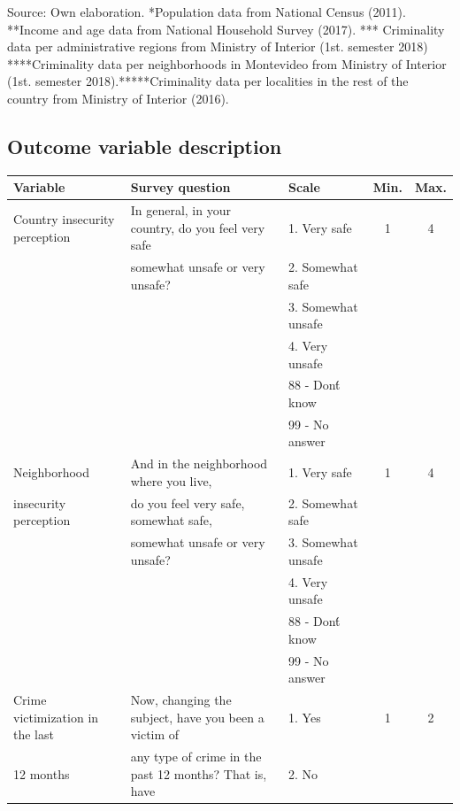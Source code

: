 \documentclass[11pt]{article}
\begin{document}
\begin{landscape}
\begin{longtable}[htbp]{@{}p{1.2cm}p{1cm}p{1.5cm}p{1cm}p{1cm}p{1cm}p{1cm}p{1cm}p{1cm}p{1cm}p{1cm}p{1.2cm}p{1cm}p{1cm}@{}}
\bottomrule
\end{longtable}

Source: Own elaboration. *Population data from National Census (2011). **Income and age data from National Household Survey (2017). *** Criminality data per administrative regions from Ministry of Interior (1st. semester 2018) ****Criminality data per neighborhoods in Montevideo from Ministry of Interior (1st. semester 2018).*****Criminality data per localities in the rest of the country from Ministry of Interior (2016).
\end{landscape}
\restoregeometry

\begin{landscape}
\section{Outcome variable description}
\begin{tiny}
\begin{tabular}{lllcc}
\textbf{Variable }	&	\textbf{Survey question} 	&	\textbf{Scale}	&	\textbf{Min.}	&	\textbf{Max.}		\\	\hline
\hline
Country insecurity  perception	&	In general, in your country, do you feel very safe	&	1. Very safe 	&	1	&	4		\\
	&	somewhat unsafe or very unsafe?	&	2. Somewhat safe 	&		&			\\
	&		&	3. Somewhat unsafe 	&		&			\\
	&		&	4. Very unsafe 	&		&			\\
	&		&	88 - Don\'t know 	&		&			\\
	&		&	99 - No answer	&		&			\\\hline
Neighborhood 	&	And in the neighborhood where you live, 	&	1. Very safe 	&	1	&	4		\\
insecurity perception	&	do you feel very safe, somewhat safe,	&	2. Somewhat safe 	&		&			\\
	&	somewhat unsafe or very unsafe?	&	3. Somewhat unsafe 	&		&			\\
	&		&	4. Very unsafe 	&		&			\\
	&		&	88 - Don\'t know 	&		&			\\
	&		&	99 - No answer	&		&			\\\hline
Crime victimization in the last 	&	Now, changing the subject, have you been a victim of 	&	1. Yes	&	1	&	2		\\
12 months	&	any type of crime in the past 12 months? That is, have	&	2. No 	&		&			\\

\end{tabular}
\end{tiny}
\end{landscape}
\end{document}
